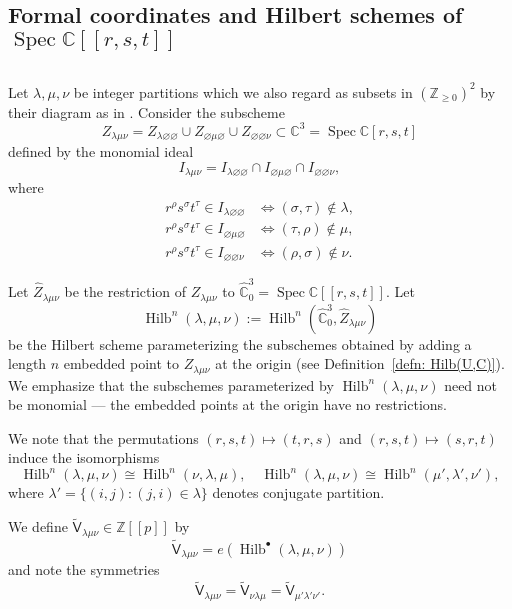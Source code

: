 \documentclass[12pt]{amsart}
\theoremstyle{definition}
\newcommand{\CC} {\mathbb{C}}          %
\newcommand{\ZZ} {\mathbb{Z}}		%
\newcommand{\sfVtilde}{\widetilde{\mathsf{V}}}
\newcommand{\Hilb}{\operatorname{Hilb}}
\newcommand{\Spec}{\operatorname{Spec}}
\renewcommand{\emptyset}{\varnothing}
\renewcommand{\hat}{\widehat}
\newcommand{\SubSecSpace}{$\,$\vspace{0.2cm}\par } %
\begin{document}
\subsection{Formal coordinates and Hilbert schemes
of $\Spec \CC [[r,s,t]]$}\label{subsec: Formal coordinates and
reduction to Hilbert scheme on C3}\SubSecSpace

Let $\lambda ,\mu ,\nu$ be integer partitions which we also regard as
subsets in $(\ZZ_{\geq 0})^{2}$ by their diagram as in
\cite{Bryan-Kool-Young}. Consider the subscheme
\[
Z_{\lambda \mu \nu}=Z_{\lambda \emptyset \emptyset}\cup
Z_{\emptyset \mu \emptyset}\cup Z_{\emptyset \emptyset \nu } \subset
\CC^{3}=\Spec \CC [r,s,t]
\]
defined by the monomial ideal
\[
I_{\lambda \mu \nu} = I_{\lambda \emptyset \emptyset}\cap I_{\emptyset \mu \emptyset}\cap I_{\emptyset \emptyset \nu},
\]
where 
\begin{align*}
r^{\rho}s^{\sigma}t^{\tau}\in I_{\lambda \emptyset \emptyset} & \iff
(\sigma ,\tau )\notin \lambda ,\\
r^{\rho}s^{\sigma}t^{\tau}\in I_{\emptyset \mu  \emptyset} & \iff
(\tau,\rho  )\notin \mu ,\\
r^{\rho}s^{\sigma}t^{\tau}\in I_{\emptyset \emptyset \nu } & \iff
(\rho ,\sigma  )\notin \nu . 
\end{align*}

Let $\hat{Z}_{\lambda \mu \nu}$ be the restriction of $Z_{\lambda \mu
\nu}$ to $\hat{\CC}^{3}_{0} = \Spec \CC [[r,s,t]]$. Let
\begin{equation} \label{defHilblambdamunu}
\Hilb^{n}(\lambda ,\mu ,\nu) := \Hilb^{n}(\hat{\CC}^{3}_{0}, \hat{Z}_{\lambda \mu \nu} )
\end{equation}
be the Hilbert scheme parameterizing the subschemes obtained by adding
a length $n$ embedded point to $Z_{\lambda \mu \nu}$ at the origin
(see Definition~\ref{defn: Hilb(U,C)}). We emphasize that the
subschemes parameterized by $\Hilb^{n}(\lambda ,\mu ,\nu )$ need not
be monomial --- the embedded points at the origin have no
restrictions. 

We note that the permutations
$(r,s,t)\mapsto (t,r,s)$ and $(r,s,t)\mapsto (s,r,t)$ induce the
isomorphisms
\[
\Hilb^{n}(\lambda ,\mu ,\nu )\cong \Hilb^{n}(\nu,\lambda,\mu   ),\quad
\Hilb^{n}(\lambda ,\mu ,\nu )\cong \Hilb^{n}( \mu ',\lambda ',\nu ' ),
\]
where $\lambda' = \{(i,j) : (j,i) \in \lambda\}$ denotes conjugate partition.

We define $\sfVtilde_{\lambda
\mu \nu}\in \ZZ [[p]]$ by
\[
\sfVtilde_{\lambda \mu \nu} = e\left(\Hilb^{\bullet}(\lambda ,\mu ,\nu ) \right)
\]
and note the symmetries 
\[
\sfVtilde_{\lambda \mu \nu}=\sfVtilde_{ \nu \lambda \mu
}=\sfVtilde_{\mu '\lambda '\nu '}.
\]
\end{document}
